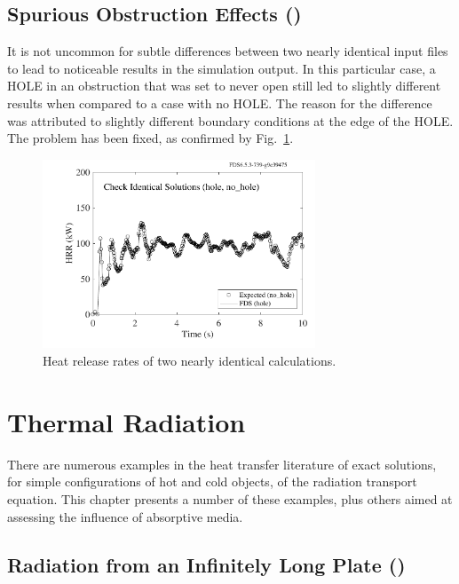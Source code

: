 \documentclass[11pt]{book}
\begin{document}
\section{Spurious Obstruction Effects (\texorpdfstring{}{hole})}
\label{hole}

It is not uncommon for subtle differences between two nearly identical input files to lead to noticeable results in the simulation output. In this particular case, a {\ct HOLE} in an obstruction that was set to never open still led to slightly different results when compared to a case with no {\ct HOLE}. The reason for the difference was attributed to slightly different boundary conditions at the edge of the {\ct HOLE}. The problem has been fixed, as confirmed by Fig.~\ref{hole_fig}.

\begin{figure}[!ht]
\centering
\includegraphics[width=3.2in]{SCRIPT_FIGURES/hole_no_hole}
\caption[Results of the  test case]{Heat release rates of two nearly identical calculations.}
\label{hole_fig}
\end{figure}



\chapter{Thermal Radiation}

There are numerous examples in the heat transfer literature of exact solutions, for simple configurations of hot and cold objects, of the radiation transport equation. This chapter presents a number of these examples, plus others aimed at assessing the influence of absorptive media.

\section{Radiation from an Infinitely Long Plate (\texorpdfstring{}{plate\_view\_factor}) }
\label{plate_view_factor}
\end{document}

